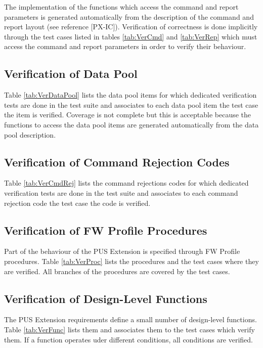 \documentclass{pnp_article}
\begin{document}
The implementation of the functions which access the command and report parameters is generated automatically from the description of the command and report layout (see reference [PX-IC]). Verification of correctness is done implicitly through the test cases listed in tables \ref{tab:VerCmd} and \ref{tab:VerRep} which must access the command and report parameters in order to verify their behaviour.


\subsection{Verification of Data Pool}\label{sec:svrVerDataPool}
Table \ref{tab:VerDataPool} lists the data pool items for which dedicated verification tests are done in the test suite and associates to each data pool item the test case the item is verified. Coverage is not complete but this is acceptable because the functions to access the data pool items are generated automatically from the data pool description.


\subsection{Verification of Command Rejection Codes}\label{sec:svrVerCmdRej}
Table \ref{tab:VerCmdRej} lists the command rejections codes for which dedicated verification tests are done in the test suite and associates to each command rejection code the test case the code is verified. 

\subsection{Verification of FW Profile Procedures}\label{sec:svrVerProc}
Part of the behaviour of the PUS Extension is specified through FW Profile procedures. Table \ref{tab:VerProc} lists the procedures and the test cases where they are verified. All branches of the procedures are covered by the test cases. 

\subsection{Verification of Design-Level Functions}\label{sec:svrVerFunc}
The PUS Extension requirements define a small number of design-level functions.  Table \ref{tab:VerFunc} lists them and associates them to the test cases which verify them. If a function operates uder different conditions, all conditions are verified. 
\end{document}
